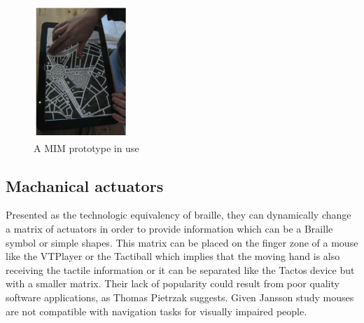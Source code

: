	\begin{figure}[!ht]
		\centering
		\includegraphics[height=5cm]{figures/mims.png}
		\caption{A MIM prototype in use}
	\end{figure}


\subsection{Machanical actuators}\label{machanical-actuators}

Presented as the technologic equivalency of braille,
they can dynamically change a matrix of actuators in order to provide information
which can be a Braille symbol or simple shapes. This matrix can be
placed on the finger zone of a mouse like the VTPlayer
or the Tactiball \cite{Lecolinet:2005:TOC:1148550.1148583} which implies that the moving hand is
also receiving the tactile information or it can be separated like the
Tactos device \cite{hanneton1998dynamique} but with a smaller matrix. Their lack of
popularity could result from poor quality software applications, as
Thomas Pietrzak suggests. Given Jansson study \cite{jansson2005obtaining} mouses are not
compatible with navigation tasks for visually impaired people.

